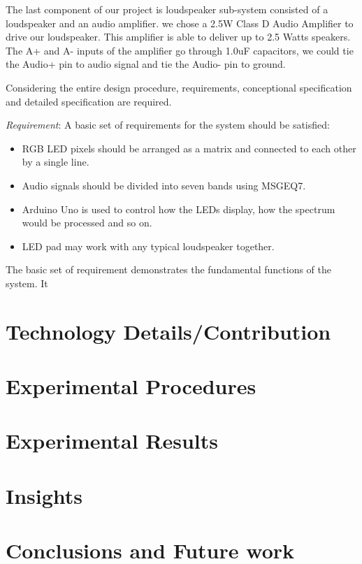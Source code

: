 \documentclass[a4paper,journal]{IEEEtran}
\begin{document}
The last component of our project is loudspeaker sub-system consisted of a loudspeaker and an audio amplifier. we chose a 2.5W Class D Audio Amplifier to drive our loudspeaker. This amplifier is able to deliver up to 2.5 Watts speakers. The A+ and A- inputs of the amplifier go through 1.0uF capacitors, we could tie the Audio+ pin to audio signal and tie the Audio- pin to ground.

Considering the entire design procedure, requirements, conceptional specification and detailed specification are required.

\emph{Requirement}: A basic set of requirements for the system should be satisfied: 

\begin{itemize}
\item RGB LED pixels should be arranged as a matrix and connected to each other by a single line.
\item Audio signals should be divided into seven bands using MSGEQ7.
\item Arduino Uno is used to control how the LEDs display, how the spectrum would be processed and so on.
\item LED pad may work with any typical loudspeaker together.
\end{itemize}

The basic set of requirement demonstrates the fundamental functions of the system. It 

\section{Technology Details/Contribution}

\section{Experimental Procedures}

\section{Experimental Results}

\section{Insights}

\section{Conclusions and Future work}
\end{document}
